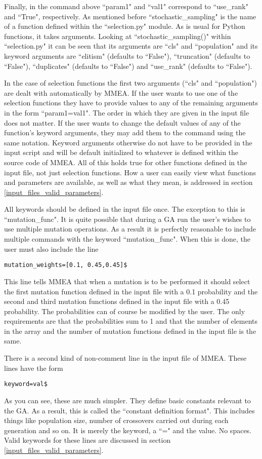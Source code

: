 \documentclass[12pt]{article}
\begin{document}
Finally, in the command above ``param1" and ``val1" correspond to ``use\_rank" and ``True", respectively. As mentioned before ``stochastic\_sampling" is the name of a function defined within the ``selection.py" module. As is usual for Python functions, it takes arguments. Looking at ``stochastic\_sampling()" within ``selection.py" it can be seen that its arguments are ``cls" and ``population" and its keyword arguments are ``elitism" (defaults to ``False"), ``truncation" (defaults to ``False"), ``duplicates" (defaults to ``False") and ``use\_rank" (defaults to ``False").

In the case of selection functions the first two arguments (``cls" and ``population") are dealt with automatically by MMEA. If the user wants to use one of the selection functions they have to provide values to any of the remaining arguments in the form ``param1=val1". The order in which they are given in the input file does not matter. If the user wants to change the default values of any of the function's keyword arguments, they may add them to the command using the same notation. Keyword arguments otherwise do not have to be provided in the input script and will be default initialized to whatever is defined within the source code of MMEA. All of this holds true for other functions defined in the input file, not just selection functions. How a user can easily view what functions and parameters are available, as well as what they mean, is addressed in section \ref{input_files_valid_parameters}.

All keywords should be defined in the input file once. The exception to this is ``mutation\_func". It is quite possible that during a GA run the user's wishes to use multiple mutation operations. As a result it is perfectly reasonable to include multiple commands with the keyword  ``mutation\_func". When this is done, the user must also include the line 
\begin{verbatim}
mutation_weights=[0.1, 0.45,0.45]$
\end{verbatim}
This line tells MMEA that when a mutation is to be performed it should select the first mutation function defined in the input file with a 0.1 probability and the second and third mutation functions defined in the input file with a 0.45 probability. The probabilities can of course be modified by the user. The only requirements are that the probabilities sum to 1 and that the number of elements in the array and the number of mutation functions defined in the input file is the same.

There is a second kind of non-comment line in the input file of MMEA. These lines have the form
\begin{verbatim}
keyword=val$
\end{verbatim}
As you can see, these are much simpler. They define basic constants relevant to the GA. As a result, this is called the ``constant definition format". This includes things like population size, number of crossovers carried out during each generation and so on. It is merely the keyword, a ``=" and the value. No spaces. Valid keywords for these lines are discussed in section \ref{input_files_valid_parameters}.
\end{document}
